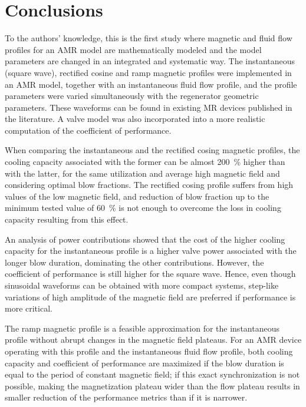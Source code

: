 \documentclass[referee]{svjour3}
\begin{document}
\section{Conclusions}
\label{sec:final-considerations}

To the authors' knowledge, this is the first study where magnetic and fluid flow profiles for an AMR model are mathematically modeled and the model parameters are changed in an integrated and systematic  way. The instantaneous (square wave), rectified cosine and ramp magnetic profiles were implemented in an AMR model, together with an instantaneous fluid flow profile, and the profile parameters were varied simultaneously with the regenerator geometric parameters. These waveforms can be found in existing MR devices published in the literature. A valve model was also incorporated into a more realistic computation of the coefficient of performance.

When comparing the instantaneous  and the rectified cosing magnetic profiles, the cooling capacity associated with the former can be almost \SI{200}{\percent} higher than with the latter, for the same utilization and average high magnetic field and considering optimal blow fractions. The rectified cosing profile suffers from high values of the low magnetic field, and reduction of blow fraction up to the minimum tested value of \SI{60}{\percent} is not enough to overcome the loss in cooling capacity resulting from this effect. 

An analysis of power contributions showed that the cost of the higher cooling capacity for the instantaneous profile is a higher valve power associated with the longer blow duration, dominating the other contributions. However, the coefficient of performance is still higher for the square wave. Hence, even though sinusoidal waveforms can be obtained with more compact systems, step-like variations of high amplitude of the magnetic field are preferred if performance is more critical.

The ramp magnetic profile is a feasible approximation for the instantaneous profile without abrupt changes in the magnetic field plateaus. For an AMR device operating with this  profile and the instantaneous fluid flow profile, both cooling capacity and coefficient of performance are maximized if the blow duration is equal to the period of constant magnetic field; if this exact synchronization is not possible, making the magnetization plateau wider than the flow plateau results in smaller reduction of the performance metrics than if it is narrower. 
\end{document}
